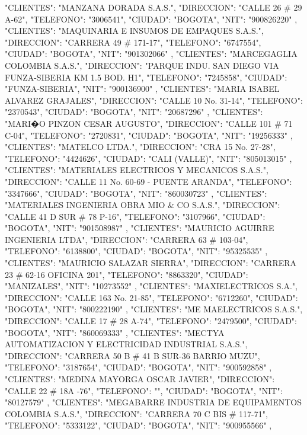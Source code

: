    {
   "CLIENTES": "MANZANA DORADA S.A.S.",
   "DIRECCION": "CALLE 26 # 29 A-62",
   "TELEFONO": "3006541",
   "CIUDAD": "BOGOTA",
   "NIT": "900826220"
   },
   {
   "CLIENTES": "MAQUINARIA E INSUMOS DE EMPAQUES S.A.S.",
   "DIRECCION": "CARRERA 49 # 171-17",
   "TELEFONO": "6747554",
   "CIUDAD": "BOGOTA",
   "NIT": "901302066"
   },
   {
   "CLIENTES": "MARCEGAGLIA COLOMBIA S.A.S.",
   "DIRECCION": "PARQUE INDU. SAN DIEGO VIA FUNZA-SIBERIA KM 1.5 BOD. H1",
   "TELEFONO": "7245858",
   "CIUDAD": "FUNZA-SIBERIA",
   "NIT": "900136900"
   },
   {
   "CLIENTES": "MARIA ISABEL ALVAREZ GRAJALES",
   "DIRECCION": "CALLE 10 No. 31-14",
   "TELEFONO": "2370543",
   "CIUDAD": "BOGOTA",
   "NIT": "20687296"
   },
   {
   "CLIENTES": "MARI�O PINZON CESAR AUGUSTO",
   "DIRECCION": "CALLE 101 # 71 C-04",
   "TELEFONO": "2720831",
   "CIUDAD": "BOGOTA",
   "NIT": "19256333"
   },
   {
   "CLIENTES": "MATELCO LTDA.",
   "DIRECCION": "CRA 15 No. 27-28",
   "TELEFONO": "4424626",
   "CIUDAD": "CALI (VALLE)",
   "NIT": "805013015"
   },
   {
   "CLIENTES": "MATERIALES ELECTRICOS Y MECANICOS S.A.S.",
   "DIRECCION": "CALLE 11 No. 60-69 - PUENTE ARANDA",
   "TELEFONO": "3347666",
   "CIUDAD": "BOGOTA",
   "NIT": "860030723"
   },
   {
   "CLIENTES": "MATERIALES INGENIERIA OBRA MIO & CO S.A.S.",
   "DIRECCION": "CALLE 41 D SUR # 78 P-16",
   "TELEFONO": "3107966",
   "CIUDAD": "BOGOTA",
   "NIT": "901508987"
   },
   {
   "CLIENTES": "MAURICIO AGUIRRE INGENIERIA LTDA",
   "DIRECCION": "CARRERA 63 # 103-04",
   "TELEFONO": "6138800",
   "CIUDAD": "BOGOTA",
   "NIT": "95325535"
   },
   {
   "CLIENTES": "MAURICIO SALAZAR SIERRA",
   "DIRECCION": "CARRERA 23 # 62-16 OFICINA 201",
   "TELEFONO": "8863320",
   "CIUDAD": "MANIZALES",
   "NIT": "10273552"
   },
   {
   "CLIENTES": "MAXIELECTRICOS S.A.",
   "DIRECCION": "CALLE 163 No. 21-85",
   "TELEFONO": "6712260",
   "CIUDAD": "BOGOTA",
   "NIT": "800222190"
   },
   {
   "CLIENTES": "ME MAELECTRICOS S.A.S.",
   "DIRECCION": "CALLE 17 # 28 A-74",
   "TELEFONO": "2479500",
   "CIUDAD": "BOGOTA",
   "NIT": "860069333"
   },
   {
   "CLIENTES": "MECTYA AUTOMATIZACION Y ELECTRICIDAD INDUSTRIAL S.A.S.",
   "DIRECCION": "CARRERA 50 B # 41 B SUR-36 BARRIO MUZU",
   "TELEFONO": "3187654",
   "CIUDAD": "BOGOTA",
   "NIT": "900592858"
   },
   {
   "CLIENTES": "MEDINA MAYORGA OSCAR JAVIER",
   "DIRECCION": "CALLE 22 # 18A -76",
   "TELEFONO": "",
   "CIUDAD": "BOGOTA",
   "NIT": "80127579"
   },
   {
   "CLIENTES": "MEGABARRE INDUSTRIA DE EQUIPAMENTOS COLOMBIA S.A.S.",
   "DIRECCION": "CARRERA 70 C BIS # 117-71",
   "TELEFONO": "5333122",
   "CIUDAD": "BOGOTA",
   "NIT": "900955566"
   },
